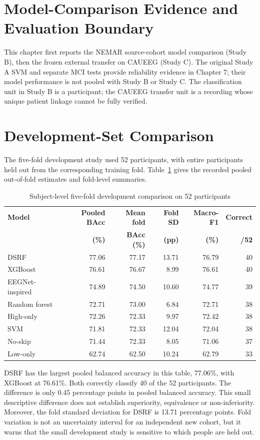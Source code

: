 \section{Model-Comparison Evidence and Evaluation Boundary}
This chapter first reports the NEMAR source-cohort model comparison (Study B), then the frozen external transfer on CAUEEG (Study C). The original Study A SVM and separate MCI tests provide reliability evidence in Chapter 7; their model performance is not pooled with Study B or Study C. The classification unit in Study B is a participant; the CAUEEG transfer unit is a recording whose unique patient linkage cannot be fully verified.

\section{Development-Set Comparison}
The five-fold development study used 52 participants, with entire participants held out from the corresponding training fold. Table~\ref{tab:dev-results} gives the recorded pooled out-of-fold estimates and fold-level summaries.
\begin{table}[htbp]\centering\footnotesize
\caption{Subject-level five-fold development comparison on 52 participants}\label{tab:dev-results}
\begin{tabular}{@{}lrrrrr@{}}\toprule
\textbf{Model}&\textbf{Pooled BAcc}&\textbf{Mean fold}&\textbf{Fold SD}&\textbf{Macro-F1}&\textbf{Correct}\\
&\textbf{(\%)}&\textbf{BAcc (\%)}&\textbf{(pp)}&\textbf{(\%)}&\textbf{/52}\\\midrule
DSRF&77.06&77.17&13.71&76.79&40\\
XGBoost&76.61&76.67&8.99&76.61&40\\
EEGNet-inspired&74.89&74.50&10.60&74.77&39\\
Random forest&72.71&73.00&6.84&72.71&38\\
High-only&72.26&72.33&9.97&72.42&38\\
SVM&71.81&72.33&12.04&72.04&38\\
No-skip&71.44&72.33&8.05&71.06&37\\
Low-only&62.74&62.50&10.24&62.79&33\\
\bottomrule\end{tabular}\end{table}

DSRF has the largest pooled balanced accuracy in this table, 77.06\%, with XGBoost at 76.61\%. Both correctly classify 40 of the 52 participants. The difference is only 0.45 percentage points in pooled balanced accuracy. This small descriptive difference does not establish superiority, equivalence or non-inferiority. Moreover, the fold standard deviation for DSRF is 13.71 percentage points. Fold variation is not an uncertainty interval for an independent new cohort, but it warns that the small development study is sensitive to which people are held out.

